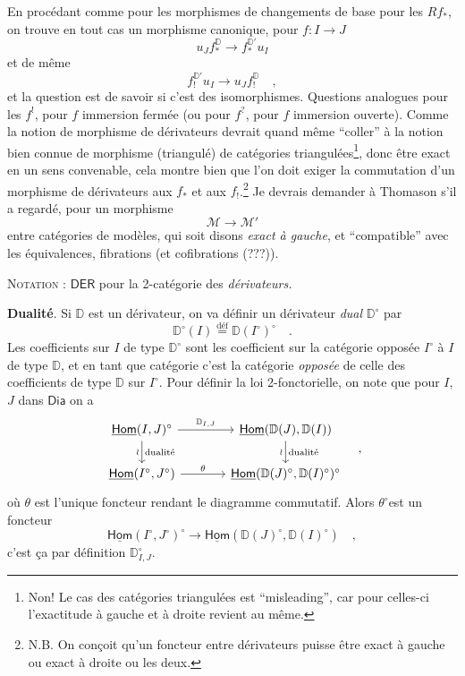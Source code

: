 \documentclass[11pt]{article}
\newcommand{\printedpage}[1]{\marginpar{\footnotesize p.~#1}}
\newcommand{\msp}[1]{\marginpar{\footnotesize [#1]}}
\newcommand{\uHom}{\underline{\mathsf{Hom}}}
\newcommand{\Dia}{\mathsf{Dia}}
\newcommand{\DD}{\mathbb{D}}
\newcommand{\defeq}{\overset{\text{déf}}{=}}
\begin{document}
En procédant comme pour les morphismes de changements de base pour les $Rf_*$, on trouve en tout cas un morphisme canonique, pour $f : I \to J$
\[
u_Jf_*^{\DD} \longrightarrow f_*^{\DD'}u_I
\]
\printedpage{13}%
et de même
\[
f_!^{\DD'}u_I \longrightarrow u_Jf_!^{\DD} \quad ,
\]
et la question est de savoir si c’est des isomorphismes. Questions analogues pour les $f^!$, pour $f$ immersion fermée (ou pour $f^?$, pour $f$ immersion ouverte). Comme la notion de morphisme de dérivateurs devrait quand même “coller” à la notion bien connue de morphisme (triangulé) de catégories triangulées\footnote[8]{Non! Le cas des catégories triangulées est “misleading”, car pour celles-ci l’exactitude à gauche et à droite revient au même.}, donc être exact en un sens convenable, cela montre bien que l’on doit exiger la commutation d’un morphisme de dérivateurs aux $f_*$ et aux $f_!$.\footnote[9]{N.B. On conçoit qu’un foncteur entre dérivateurs puisse être exact à gauche ou exact à droite ou les deux.} Je devrais demander à Thomason s’il a regardé, pour un morphisme
\[
\mathcal{M} \longrightarrow \mathcal{M}'
\]
entre catégories de modèles, qui soit disons \textit{exact à gauche}, et “compatible” avec les équivalences, fibrations (et cofibrations (???)).

\noindent\textsc{Notation} : $\mathsf{DER}$ pour la 2-catégorie des \textit{dérivateurs.}

\noindent\msp{page 17}\textbf{Dualité}. Si $\DD$ est un dérivateur, on va définir un dérivateur \textit{dual} $\DD^\circ$ par
\[
\DD^\circ(I) \defeq \DD(I^\circ)^\circ \quad .
\]
Les coefficients sur $I$ de type $\DD^\circ$ sont les coefficient sur la catégorie opposée $I^\circ$ à $I$ de type $\DD$, et en tant que catégorie c’est la catégorie \textit{opposée} de celle des coefficients de type $\DD$ sur $I^\circ$. Pour définir la loi 2-fonctorielle, on note que pour $I$, $J$ dans $\Dia$ on a %
\[
\begin{tikzcd}[column sep=large]
\uHom(I,J)^\circ \arrow[r, "\DD_{I,J}"] \arrow[d, "\wr"', "\text{dualité}"] & \uHom(\DD(J),\DD(I)) \arrow[d, "\wr"', "\text{dualité}"] \\
\uHom(I^\circ,J^\circ) \arrow[r, "\theta"] & \uHom(\DD(J)^\circ,\DD(I)^\circ)^\circ
\end{tikzcd}
\quad ,
\]
où $\theta$ est l’unique foncteur rendant le diagramme commutatif. Alors $\theta^\circ$est un foncteur
\[
\uHom(I^\circ,J^\circ)^\circ \longrightarrow \uHom(\DD(J)^\circ,\DD(I)^\circ) \quad ,
\]
c’est ça par définition $\DD^\circ_{I,J}$.
\end{document}
